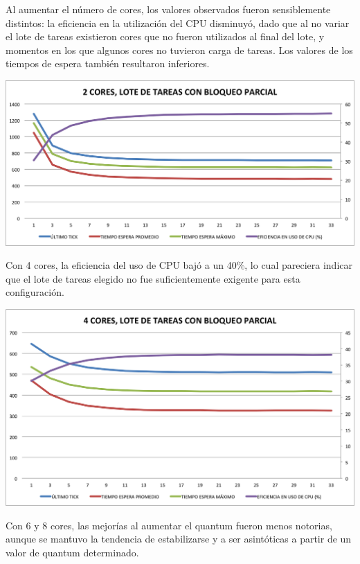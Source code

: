 Al aumentar el n\'umero de cores, los valores observados fueron sensiblemente distintos: la eficiencia en la utilizaci\'on del CPU disminuy\'o, dado que al no variar el lote de tareas existieron cores que no fueron utilizados al final del lote, y momentos en los que algunos cores no tuvieron carga de tareas. Los valores de los tiempos de espera tambi\'en resultaron inferiores.

\begin{center}
	\includegraphics[scale=0.4]{graficos/2cores_loteNormal.png}
\end{center}

Con 4 cores, la eficiencia del uso de CPU baj\'o a un 40\%, lo cual pareciera indicar que el lote de tareas elegido no fue suficientemente exigente para esta configuraci\'on. 

\begin{center}
	\includegraphics[scale=0.4]{graficos/4cores_loteNormal.png}
\end{center}

Con 6 y 8 cores, las mejor\'ias al aumentar el quantum fueron menos notorias, aunque se mantuvo la tendencia de estabilizarse y a ser asint\'oticas a partir de un valor de quantum determinado.

